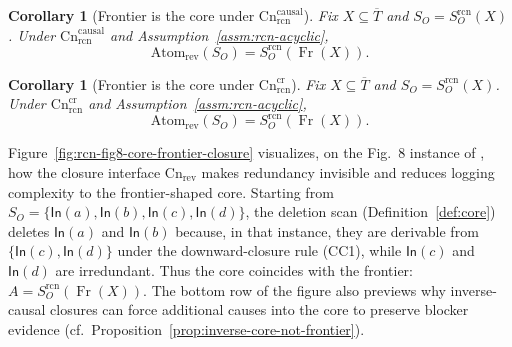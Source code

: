 \documentclass[twoside]{article}
\DeclareMathOperator{\Fr}{Fr}
\newtheorem{corollary}[theorem]{Corollary}
\newcommand{\Cn}{\mathrm{Cn}}
\newcommand{\Atom}{\mathrm{Atom}}
\newcommand{\1}{\mathbf{1}}
\begin{document}
\begin{corollary}[Frontier is the core under \(\Cn^{\mathrm{causal}}_{\mathrm{rcn}}\)]
\label{cor:frontier-core-causal}
Fix \(X\subseteq\overline{T}\) and \(S_O=S_O^{\mathrm{rcn}}(X)\).
Under \(\Cn^{\mathrm{causal}}_{\mathrm{rcn}}\) and Assumption~\ref{assm:rcn-acyclic},
\[
\Atom_{\mathrm{rev}}(S_O)=S_O^{\mathrm{rcn}}(\Fr(X)).
\]
\end{corollary}

\begin{corollary}[Frontier is the core under \(\Cn^{\mathrm{cr}}_{\mathrm{rcn}}\)]
\label{cor:frontier-core-cr}
Fix \(X\subseteq\overline{T}\) and \(S_O=S_O^{\mathrm{rcn}}(X)\).
Under \(\Cn^{\mathrm{cr}}_{\mathrm{rcn}}\) and Assumption~\ref{assm:rcn-acyclic},
\[
\Atom_{\mathrm{rev}}(S_O)=S_O^{\mathrm{rcn}}(\Fr(X)).
\]
\end{corollary}

Figure~\ref{fig:rcn-fig8-core-frontier-closure} visualizes, on the Fig.~8 instance of \cite{melgratti2024reversible}, how the closure interface
\(\Cn_{\mathrm{rev}}\) makes redundancy invisible and reduces logging complexity to the frontier-shaped core.
Starting from \(S_O=\{\mathsf{In}(a),\mathsf{In}(b),\mathsf{In}(c),\mathsf{In}(d)\}\), the deletion scan (Definition~\ref{def:core})
deletes \(\mathsf{In}(a)\) and \(\mathsf{In}(b)\) because, in that instance, they are derivable from \(\{\mathsf{In}(c),\mathsf{In}(d)\}\) under the
downward-closure rule (CC1), while \(\mathsf{In}(c)\) and \(\mathsf{In}(d)\) are irredundant.
Thus the core coincides with the frontier: \(A=S_O^{\mathrm{rcn}}(\Fr(X))\).
The bottom row of the figure also previews why inverse-causal closures can force additional causes into the core
to preserve blocker evidence (cf.\ Proposition~\ref{prop:inverse-core-not-frontier}).
\end{document}
